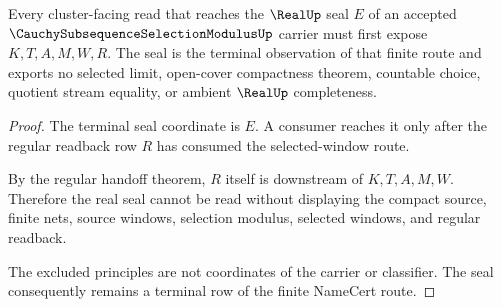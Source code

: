 \begin{theorem}
\label{thm:cauchy-subsequence-selection-modulus-real-nonescape}
Every cluster-facing read that reaches the $\RealUp$ seal $E$ of an accepted $\CauchySubsequenceSelectionModulusUp$ carrier must first expose $K,T,A,M,W,R$. The seal is the terminal observation of that finite route and exports no selected limit, open-cover compactness theorem, countable choice, quotient stream equality, or ambient $\RealUp$ completeness.
\end{theorem}
\begin{proof}
The terminal seal coordinate is $E$. A consumer reaches it only after the regular readback row $R$ has consumed the selected-window route.

By the regular handoff theorem, $R$ itself is downstream of $K,T,A,M,W$. Therefore the real seal cannot be read without displaying the compact source, finite nets, source windows, selection modulus, selected windows, and regular readback.

The excluded principles are not coordinates of the carrier or classifier. The seal consequently remains a terminal row of the finite NameCert route.
\end{proof}




